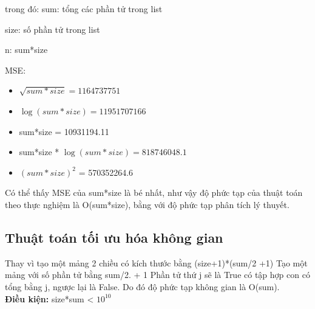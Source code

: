 \documentclass[12pt, letterpaper]{article}
\begin{document}
trong đó: sum: tổng các phần tử trong list

          size: số phần tử trong list
          
          n: sum*size
          
MSE: 
\begin{itemize}
    \item $\sqrt{sum*size} = 1164737751$
    \item $\log{(sum*size)} = 11951707166$
    \item sum*size = 10931194.11
    \item sum*size * $\log{(sum*size)} = 818746048.1$
    \item \((sum*size)^2\) = 570352264.6
\end{itemize}

Có thể thấy MSE của sum*size là bé nhất, như vậy độ phức tạp của thuật toán theo thực nghiệm là O(sum*size), bằng với độ phức tạp phân tích lý thuyết.

\subsection{Thuật toán tối ưu hóa không gian}
Thay vì tạo một mảng 2 chiều có kích thước bằng (size+1)*(sum/2 +1)
Tạo một mảng với số phần tử bằng sum/2. + 1 Phần tử thứ j sẽ là True có tập hợp con có tổng bằng j, ngược lại là False.
Do đó độ phức tạp không gian là O(sum).\\

\textbf{Điều kiện:} size*sum < $10^{10}$\\
\end{document}
